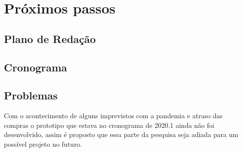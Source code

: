 \section{Próximos passos}
\subsection{Plano de Redação}
\subsection{Cronograma}
\subsection{Problemas}
Com o acontecimento de alguns imprevistos com a pandemia e atraso das compras o prototipo que estava no cronograma de 2020.1 ainda não foi desenvolvido, assim é proposto que essa parte da pesquisa seja adiada para um possível projeto no futuro. 